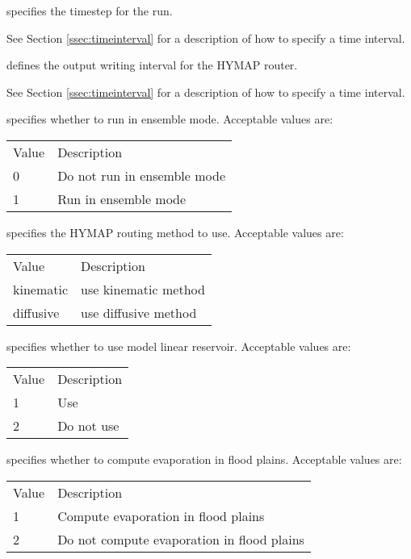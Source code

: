  
  specifies the timestep for
 the run.

 See Section \ref{ssec:timeinterval} for a description
 of how to specify a time interval.

  defines the output
 writing interval for the HYMAP router.

 See Section \ref{ssec:timeinterval} for a description
 of how to specify a time interval.

  specifies whether to run in
 ensemble mode.
 Acceptable values are:

 \begin{tabular}{ll}
 Value & Description                 \\
 0     & Do not run in ensemble mode \\
 1     & Run in ensemble mode        \\
 \end{tabular}

  specifies the HYMAP routing method
 to use.
 Acceptable values are:

 \begin{tabular}{ll}
 Value     & Description          \\
 kinematic & use kinematic method \\
 diffusive & use diffusive method \\
 \end{tabular}

  specifies whether to
 use model linear reservoir.
 Acceptable values are:

 \begin{tabular}{ll}
 Value & Description \\
 1     & Use         \\
 2     & Do not use  \\
 \end{tabular}

  specifies whether
 to compute evaporation in flood plains.
 Acceptable values are:

 \begin{tabular}{ll}
 Value & Description                                \\
 1     & Compute evaporation in flood plains        \\
 2     & Do not compute evaporation in flood plains \\
 \end{tabular}


